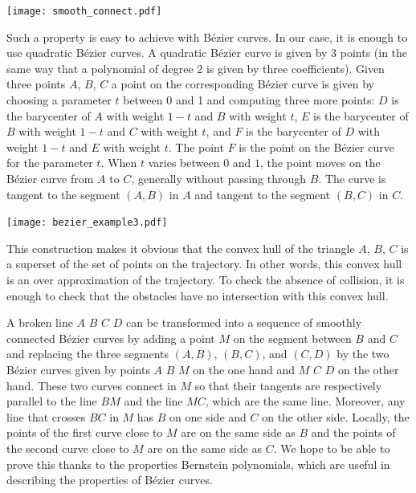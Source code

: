 \documentclass{easychair}
\begin{document}
\begin{center}
\texttt{[image: smooth\_connect.pdf]}
\end{center}

Such a property is easy to achieve with Bézier curves.  In our case,
it is enough to use quadratic Bézier curves.  A quadratic Bézier curve
is given by 3 points (in the same way that a polynomial of degree 2 is
given by three coefficients).  Given three points \(A\), \(B\), \(C\)
a point on the corresponding Bézier curve is given by choosing a
parameter \(t\) between 0 and 1 and computing three more points:
\(D\) is the barycenter of \(A\) with weight \(1 - t\) and \(B\) with
weight \(t\), \(E\) is the barycenter of \(B\) with weight \(1 - t\)
and \(C\) with weight \(t\), and \(F\) is the barycenter of \(D\) with
weight \(1-t\) and \(E\) with weight \(t\).  The point \(F\) is the
point on the Bézier curve for the parameter \(t\).  When \(t\) varies
between \(0\) and \(1\), the point moves on the Bézier curve from \(A\)
to \(C\), generally without passing through \(B\).  The curve
is tangent to the segment \((A,B)\) in \(A\) and tangent to
the segment \((B,C)\) in \(C\).

\begin{center}
\texttt{[image: bezier\_example3.pdf]}
\end{center}

This construction makes it obvious that the convex hull of
the triangle \(A\), \(B\), \(C\) is a superset of the set of points on the
trajectory.  In other words, this convex hull is an over approximation of
the trajectory.  To check the absence of collision, it is enough to check that
the obstacles have no intersection with this convex hull.

A broken line \(A\) \(B\) \(C\) \(D\) can be transformed into a sequence
of smoothly connected Bézier
curves by adding a point \(M\) on the segment between \(B\) and \(C\)
and replacing the three segments \((A, B)\), \((B, C)\), and \((C,
D)\) by the two Bézier curves given by points \(A\) \(B\) \(M\) on the
one hand and \(M\) \(C\) \(D\) on the other hand.  These two curves
connect in \(M\) so that their tangents are respectively parallel to
the line \(BM\) and the line \(MC\), which are the same line.  Moreover,
any line that crosses \(BC\) in \(M\) has \(B\) on one side and \(C\) on the
other side.  Locally, the points of the first curve close to \(M\) are on the
same side as \(B\) and the points of the second curve close to \(M\) are on
the same side as \(C\).  We hope to be able to prove this thanks to the
properties Bernstein polynomials, which are useful in describing the properties
of Bézier curves.
\end{document}
